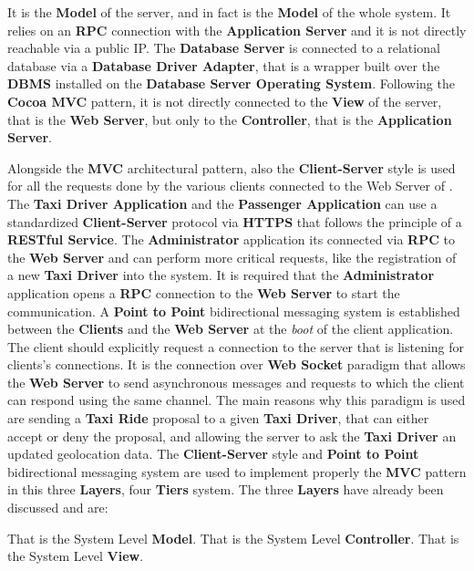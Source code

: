 \begin{itemize}
\begin{itemize}
		 It is the \textbf{Model} of the server, and in fact is the \textbf{Model} of the whole \myTaxiService{} system. It relies on an \textbf{RPC} connection with the \textbf{Application Server} and it is not directly reachable via a public IP. The \textbf{Database Server} is connected to a relational database via a \textbf{Database Driver Adapter}, that is a wrapper built over the \textbf{DBMS} installed on the \textbf{Database Server Operating System}. Following the \textbf{Cocoa MVC} pattern, it is not directly connected to the \textbf{View} of the server, that is the \textbf{Web Server}, but only to the \textbf{Controller}, that is the \textbf{Application Server}.
	\end{itemize}
\end{itemize}
Alongside the \textbf{MVC} architectural pattern, also the \textbf{Client-Server} style is used for all the requests done by the various clients connected to the Web Server of \myTaxiService{}. The \textbf{Taxi Driver Application} and the \textbf{Passenger Application} can use a standardized \textbf{Client-Server} protocol via \textbf{HTTPS} that follows the principle of a \textbf{RESTful Service}. The \textbf{Administrator} application its connected via \textbf{RPC} to the \textbf{Web Server} and can perform more critical requests, like the registration of a new \textbf{Taxi Driver} into the system. It is required that the \textbf{Administrator} application opens a \textbf{RPC} connection to the \textbf{Web Server} to start the communication.
A \textbf{Point to Point} bidirectional messaging system is established between the \textbf{Clients} and the \textbf{Web Server} at the \textit{boot} of the client application. The client should explicitly request a connection to the server that is listening for clients's connections. It is the connection over \textbf{Web Socket} paradigm that allows the \textbf{Web Server} to send asynchronous messages and requests to which the client can respond using the same channel. The main reasons why this paradigm is used are sending a \textbf{Taxi Ride} proposal to a given \textbf{Taxi Driver}, that can either accept or deny the proposal, and allowing the server to ask the \textbf{Taxi Driver} an updated geolocation data.
The \textbf{Client-Server} style and \textbf{Point to Point} bidirectional messaging system are used to implement properly the \textbf{MVC} pattern in this three \textbf{Layers}, four \textbf{Tiers} system.
The three \textbf{Layers} have already been discussed and are:
\begin{itemize}
	 That is the System Level \textbf{Model}.
	 That is the System Level \textbf{Controller}.
	 That is the System Level \textbf{View}.
\end{itemize}
